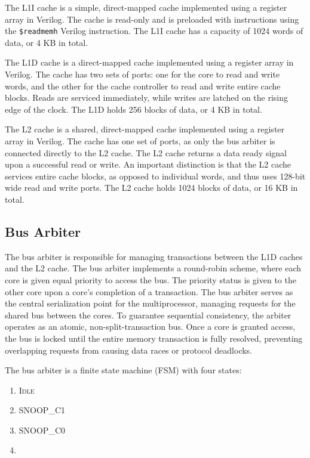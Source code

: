 \documentclass[10pt, compsoc]{IEEEtran}
\begin{document}
The L1I cache is a simple, direct-mapped cache implemented using a register array in Verilog. The cache is read-only and is preloaded with instructions using the \texttt{\$readmemh} Verilog instruction. The L1I cache has a capacity of 1024 words of data, or 4 KB in total.



The L1D cache is a direct-mapped cache implemented using a register array in Verilog. The cache has two sets of ports: one for the core to read and write words, and the other for the cache controller to read and write entire cache blocks. Reads are serviced immediately, while writes are latched on the rising edge of the clock. The L1D holds 256 blocks of data, or 4 KB in total.



The L2 cache is a shared, direct-mapped cache implemented using a register array in Verilog. The cache has one set of ports, as only the bus arbiter is connected directly to the L2 cache. The L2 cache returns a data ready signal upon a successful read or write. An important distinction is that the L2 cache services entire cache blocks, as opposed to individual words, and thus uses 128-bit wide read and write ports. The L2 cache holds 1024 blocks of data, or 16 KB in total. 



\subsection{Bus Arbiter} 

The bus arbiter is responsible for managing transactions between the L1D caches and the L2 cache. The bus arbiter implements a round-robin scheme, where each core is given equal priority to access the bus. The priority status is given to the other core upon a core's completion of a transaction. The bus arbiter serves as the central serialization point for the multiprocessor, managing requests for the shared bus between the cores. To guarantee sequential consistency, the arbiter operates as an atomic, non-split-transaction bus. Once a core is granted access, the bus is locked until the entire memory transaction is fully resolved, preventing overlapping requests from causing data races or protocol deadlocks.



The bus arbiter is a finite state machine (FSM) with four states:

\begin{enumerate}

    \item \textsc{Idle} 

    \item \textsc{SNOOP\_C1} 

    \item \textsc{SNOOP\_C0} 

    \item {}

\end{enumerate}
\end{document}
